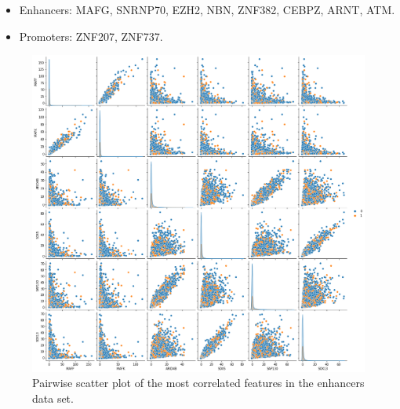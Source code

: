\documentclass{article}
\begin{document}
\begin{itemize}
    \item Enhancers: MAFG, SNRNP70, EZH2, NBN, ZNF382, CEBPZ, ARNT, ATM.
    \item Promoters: ZNF207, ZNF737.
\end{itemize}

\begin{figure}
    \centering
    \includegraphics[width=\textwidth]{img/most_correlated_features_enhancers.png}
    \caption{Pairwise scatter plot of the most correlated features in the enhancers data set.}
    \label{fig:exp:corr_feat_enh}
\end{figure}
\end{document}
